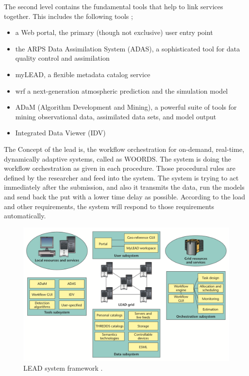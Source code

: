 The second level contains the fundamental tools that help to link services together. This includes the following tools \cite{Droegemeier2005Service-OrientedWeather};
\begin{itemize}
    \item a Web portal, the primary (though not exclusive) user entry point
    \item the ARPS Data Assimilation System (ADAS), a sophisticated tool for data quality control and assimilation
    \item myLEAD, a flexible metadata catalog service
    \item \acrfull{wrf} a next-generation atmospheric prediction and the simulation model
    \item ADaM (Algorithm Development and Mining), a powerful suite of tools for mining observational data, assimilated data sets, and model output 
    \item Integrated Data Viewer (IDV) 
\end{itemize}

The Concept of the \acrshort{lead} is, the workflow orchestration for on-demand, real-time, dynamically adaptive systems, called as WOORDS. The system is doing the workflow orchestration as given in each procedure. Those procedural rules are defined by the researcher and feed into the system. The system is trying to act immediately after the submission, and also it transmits the data, run the models and send back the put with a lower time delay as possible. According to the load and other requirements, the system will respond to those requirements automatically.

\begin{figure}[htp]
    \centering
    \includegraphics[width=1.0\textwidth]{lit/lead/LEAD-system-framework-LEAD-is-composed-of-several-interacting-subsystems-with-the-LEAD_W640.png}
    \caption[LEAD system framework]{LEAD system framework \cite{Droegemeier2005Service-OrientedWeather}.}
    \label{fi:lead_framework}
\end{figure}

